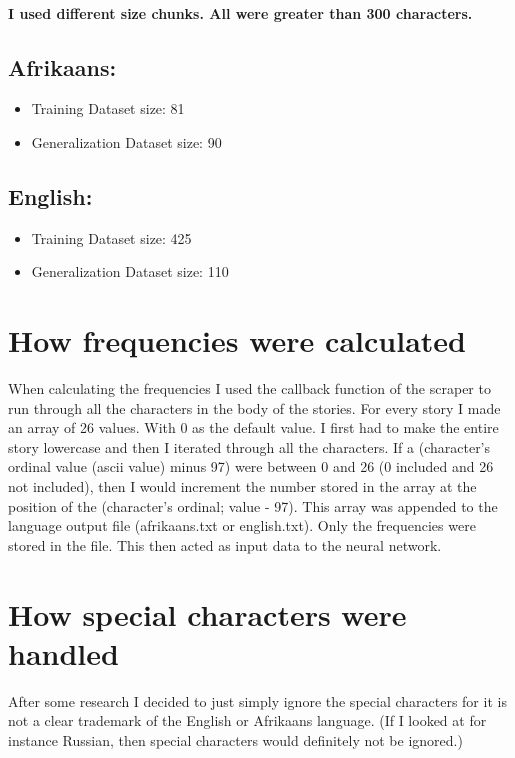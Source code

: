 \documentclass[pdftex,10pt,a4paper]{report}
\begin{document}
\paragraph{I used different size chunks. All were greater than 300 characters. }	
\subsection{Afrikaans:}
	\begin{itemize}
		\item Training Dataset size: 81
		\item Generalization Dataset size: 90
	\end{itemize}	
\subsection{English:}	
	\begin{itemize}
		\item Training Dataset size: 425
		\item Generalization Dataset size: 110
	\end{itemize}	

\section{How frequencies were calculated}

When calculating the frequencies I used the callback function of the scraper to run through all the characters in the body of the stories. For every story I made an array of 26 values. With 0 as the default value. I first had to make the entire story lowercase and then I iterated through all the characters. If a (character's ordinal value (ascii value) minus 97) were between 0 and 26 (0 included and 26 not included), then I would increment the number stored in the array at the position of the (character's ordinal; value - 97). This array was appended to the language output file (afrikaans.txt or english.txt). Only the frequencies were stored in the file. This then acted as input data to the neural network.

\section{How special characters were handled}

After some research I decided to just simply ignore the special characters for it is not a clear trademark of the English or Afrikaans language. (If I looked at for instance Russian, then special characters would definitely not be ignored.) 
\end{document}
